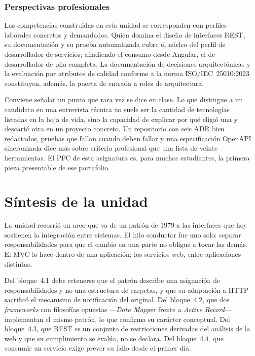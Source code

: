 \documentclass[11pt,a4paper,openany]{book}
\begin{document}
\subsubsection{Perspectivas profesionales}

Las competencias construidas en esta unidad se corresponden con perfiles laborales concretos y demandados. Quien domina el diseño de interfaces REST, su documentación y su prueba automatizada cubre el núcleo del perfil de desarrollador de servicios; añadiendo el consumo desde Angular, el de desarrollador de pila completa. La documentación de decisiones arquitectónicas y la evaluación por atributos de calidad conforme a la norma ISO/IEC~25010:2023 \cite{iso25010} constituyen, además, la puerta de entrada a roles de arquitectura.

Conviene señalar un punto que rara vez se dice en clase. Lo que distingue a un candidato en una entrevista técnica no suele ser la cantidad de tecnologías listadas en la hoja de vida, sino la capacidad de explicar por qué eligió una y descartó otra en un proyecto concreto. Un repositorio con seis ADR bien redactados, pruebas que fallan cuando deben fallar y una especificación OpenAPI sincronizada dice más sobre criterio profesional que una lista de veinte herramientas. El PFC de esta asignatura es, para muchos estudiantes, la primera pieza presentable de ese portafolio.

\section*{Síntesis de la unidad}

La unidad recorrió un arco que va de un patrón de 1979 a las interfaces que hoy sostienen la integración entre sistemas. El hilo conductor fue uno solo: separar responsabilidades para que el cambio en una parte no obligue a tocar las demás. El MVC lo hace dentro de una aplicación; los servicios web, entre aplicaciones distintas.

Del bloque~4.1 debe retenerse que el patrón describe una asignación de responsabilidades y no una estructura de carpetas, y que su adaptación a HTTP sacrificó el mecanismo de notificación del original. Del bloque~4.2, que dos \emph{frameworks} con filosofías opuestas ---\emph{Data Mapper} frente a \emph{Active Record}--- implementan el mismo patrón, lo que confirma su carácter conceptual. Del bloque~4.3, que REST es un conjunto de restricciones derivadas del análisis de la web y que su cumplimiento se evalúa, no se declara. Del bloque~4.4, que consumir un servicio exige prever su fallo desde el primer día.
\end{document}

